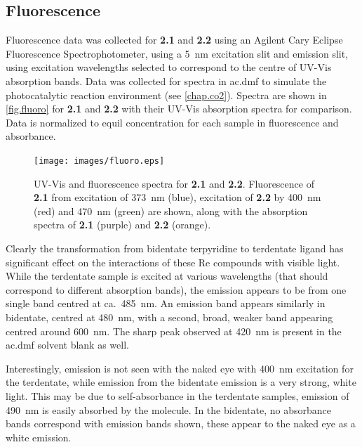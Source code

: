 \FloatBarrier
\subsection{Fluorescence}\label{ss.fluorescence}

Fluorescence data was collected for \textbf{2.1} and \textbf{2.2} using an Agilent Cary Eclipse Fluorescence Spectrophotometer, using a 5~nm excitation slit and emission slit, using excitation wavelengths selected to correspond to the centre of UV-Vis absorption bands. Data was collected for spectra in \gls{ac.dmf} to simulate the photocatalytic reaction environment (see \autoref{chap.co2}). Spectra are shown in \autoref{fig.fluoro} for \textbf{2.1} and \textbf{2.2} with their UV-Vis absorption spectra for comparison. Data is normalized to equil concentration for each sample in fluorescence and absorbance.

\begin{figure}[!htb]
 \centering
  \texttt{[image: images/fluoro.eps]}
 \caption[UV-Vis and fluorescence spectra for \textbf{2.1} and \textbf{2.2}]{UV-Vis and fluorescence spectra for \textbf{2.1} and \textbf{2.2}. Fluorescence of \textbf{2.1} from excitation of 373~nm (blue), excitation of \textbf{2.2} by 400~nm (red) and 470~nm (green) are shown, along with the absorption spectra of \textbf{2.1} (purple) and \textbf{2.2} (orange).}
 \label{fig.fluoro}
\end{figure}

Clearly the transformation from bidentate terpyridine to terdentate ligand has significant effect on the interactions of these Re compounds with visible light. While the terdentate sample is excited at various wavelengths (that should correspond to different absorption bands), the emission appears to be from one single band centred at ca.~485~nm. An emission band appears similarly in bidentate, centred at 480~nm, with a second, broad, weaker band appearing centred around 600~nm. The sharp peak observed at 420~nm is present in the \gls{ac.dmf} solvent blank as well.

Interestingly, emission is not seen with the naked eye with 400~nm excitation for the terdentate, while emission from the bidentate emission is a very strong, white light. This may be due to self-absorbance in the terdentate samples, emission of 490~nm is easily absorbed by the molecule. In the bidentate, no absorbance bands correspond with emission bands shown, these appear to the naked eye as a white emission.


